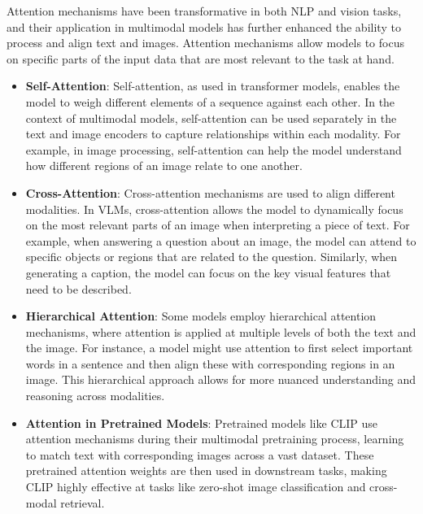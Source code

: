Attention mechanisms have been transformative in both NLP and vision tasks, and their application in multimodal models has further enhanced the ability to process and align text and images. Attention mechanisms allow models to focus on specific parts of the input data that are most relevant to the task at hand.

\begin{itemize}
    \item \textbf{Self-Attention}: Self-attention, as used in transformer models, enables the model to weigh different elements of a sequence against each other. In the context of multimodal models, self-attention can be used separately in the text and image encoders to capture relationships within each modality. For example, in image processing, self-attention can help the model understand how different regions of an image relate to one another.
    \item \textbf{Cross-Attention}: Cross-attention mechanisms are used to align different modalities. In VLMs, cross-attention allows the model to dynamically focus on the most relevant parts of an image when interpreting a piece of text. For example, when answering a question about an image, the model can attend to specific objects or regions that are related to the question. Similarly, when generating a caption, the model can focus on the key visual features that need to be described.
    \item \textbf{Hierarchical Attention}: Some models employ hierarchical attention mechanisms, where attention is applied at multiple levels of both the text and the image. For instance, a model might use attention to first select important words in a sentence and then align these with corresponding regions in an image. This hierarchical approach allows for more nuanced understanding and reasoning across modalities.
    \item \textbf{Attention in Pretrained Models}: Pretrained models like CLIP use attention mechanisms during their multimodal pretraining process, learning to match text with corresponding images across a vast dataset. These pretrained attention weights are then used in downstream tasks, making CLIP highly effective at tasks like zero-shot image classification and cross-modal retrieval.
\end{itemize}

